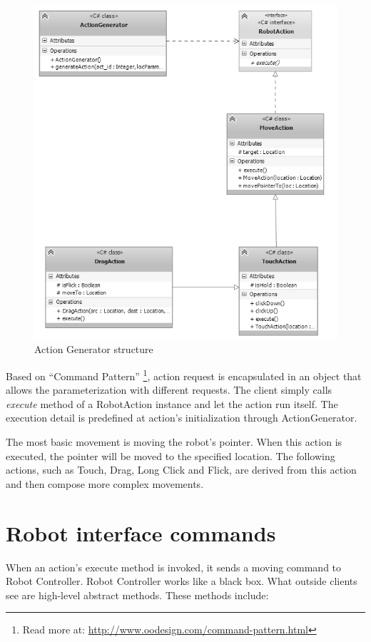 	\begin{figure}[H]
		\centering
		\includegraphics[scale=0.75]{Chapters/Fig/act_gen.png}
		\caption{Action Generator structure}
		\label{fig:act_gen}
	\end{figure}

Based on ``Command Pattern'' \footnote{Read more at: \url{http://www.oodesign.com/command-pattern.html}}, action request is encapsulated in an object that allows the parameterization with different requests. The client simply calls \textit{execute} method of a RobotAction instance and let the action run itself. The execution detail is predefined at action's initialization through ActionGenerator.

The most basic movement is moving the robot's pointer. When this action is executed, the pointer will be moved to the specified location. The following actions, such as Touch, Drag, Long Click and Flick, are derived from this action and then compose more complex movements.

\section{Robot interface commands}
When an action's execute method is invoked, it sends a moving command to Robot Controller. Robot Controller works like a black box. What outside clients see are high-level abstract methods. These methods include:

